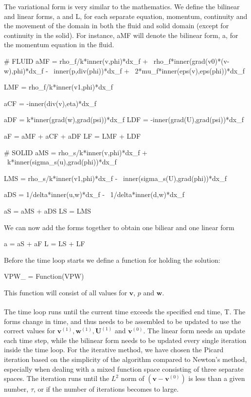 The variational form is very similar to the mathematics. We define the bilinear and linear forms, a and L, for each separate equation, momentum, continuity and the movement of the domain in both the fluid and solid domain (except for continuity in the solid). For instance, aMF will denote the bilinear form, a, for the momentum equation in the fluid.
\begin{cverbatim}
# FLUID
aMF = rho_f/k*inner(v,phi)*dx_f + \
	rho_f*inner(grad(v0)*(v-w),phi)*dx_f - \
	 inner(p,div(phi))*dx_f + \
	2*mu_f*inner(eps(v),eps(phi))*dx_f

LMF = rho_f/k*inner(v1,phi)*dx_f

aCF = -inner(div(v),eta)*dx_f

aDF = k*inner(grad(w),grad(psi))*dx_f
LDF = -inner(grad(U),grad(psi))*dx_f

aF = aMF + aCF + aDF
LF = LMF + LDF

# SOLID
aMS = rho_s/k*inner(v,phi)*dx_f + \
	k*inner(sigma_s(u),grad(phi))*dx_f

LMS = rho_s/k*inner(v1,phi)*dx_f - \
	inner(sigma_s(U),grad(phi))*dx_f

aDS = 1/delta*inner(u,w)*dx_f - \
	1/delta*inner(d,w)*dx_f


aS = aMS + aDS
LS = LMS

\end{cverbatim}
We can now add the forms together to obtain one biliear and one linear form
\begin{cverbatim}
a = aS + aF 
L = LS + LF
\end{cverbatim}
Before the time loop starts we define a function for holding the solution:
\begin{cverbatim}
VPW_ = Function(VPW)
\end{cverbatim}
This function will consist of all values for $\mathbf{v}$, $p$ and $\mathbf{w}$.
\\
\\
The time loop runs until the current time exceeds the specified end time, T. The forms change in time, and thus needs to be assembled to be updated to use the correct values for $\mathbf{v}^{(1)}, \mathbf{w}^{(1)}, \mathbf{U}^{(1)}$ and $\mathbf{v}^{(0)}$. The linear form needs an update each time step, while the bilinear form needs to be updated every single iteration inside the time loop. For the iterative method, we have chosen the Picard iteration based on the simplicity of the algorithm compared to Newton's method, especially when dealing with a mixed function space consisting of three separate spaces. The iteration runs until the $L^2$ norm of $(\mathbf{v}-\mathbf{v}^{(0)})$ is less than a given number, $\tau$, or if the number of iterations becomes to large. 

